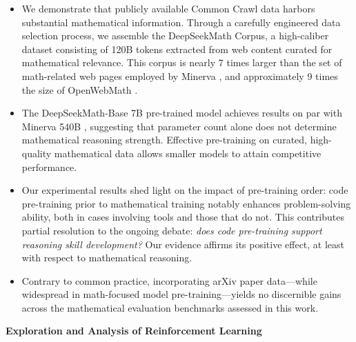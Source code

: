 \begin{itemize}[topsep=0pt]
    \item We demonstrate that publicly available Common Crawl data harbors substantial mathematical information. Through a carefully engineered data selection process, we assemble the DeepSeekMath Corpus, a high-caliber dataset consisting of 120B tokens extracted from web content curated for mathematical relevance. This corpus is nearly 7 times larger than the set of math-related web pages employed by Minerva \citep{minerva}, and approximately 9 times the size of OpenWebMath \citep{openwebmath}.

    \item The DeepSeekMath-Base 7B pre-trained model achieves results on par with Minerva 540B \citep{minerva}, suggesting that parameter count alone does not determine mathematical reasoning strength. Effective pre-training on curated, high-quality mathematical data allows smaller models to attain competitive performance.

    \item Our experimental results shed light on the impact of pre-training order: code pre-training prior to mathematical training notably enhances problem-solving ability, both in cases involving tools and those that do not. This contributes partial resolution to the ongoing debate: \textit{does code pre-training support reasoning skill development?} Our evidence affirms its positive effect, at least with respect to mathematical reasoning.

    \item Contrary to common practice, incorporating arXiv paper data—while widespread in math-focused model pre-training—yields no discernible gains across the mathematical evaluation benchmarks assessed in this work.
\end{itemize}

\textbf{Exploration and Analysis of Reinforcement Learning}

